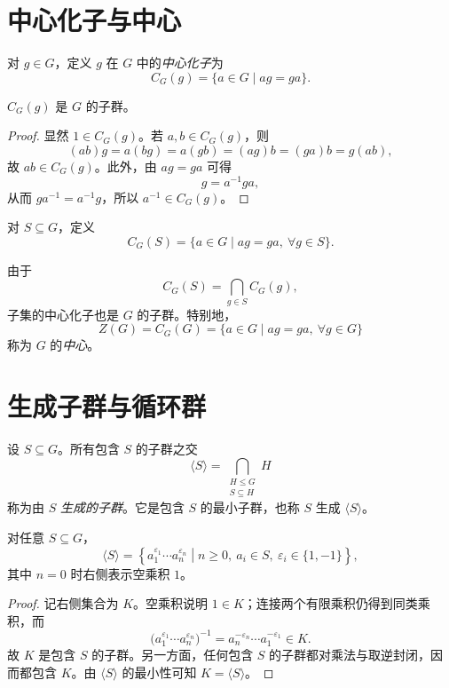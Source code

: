 \section{中心化子与中心}

\begin{definition}[元素的中心化子]
对 $g\in G$，定义 $g$ 在 $G$ 中的\emph{中心化子}为
\[
  C_G(g)=\{a\in G\mid ag=ga\}.
\]
\end{definition}

\begin{proposition}
$C_G(g)$ 是 $G$ 的子群。
\end{proposition}

\begin{proof}
显然 $1\in C_G(g)$。若 $a,b\in C_G(g)$，则
\[
  (ab)g=a(bg)=a(gb)=(ag)b=(ga)b=g(ab),
\]
故 $ab\in C_G(g)$。此外，由 $ag=ga$ 可得
\[
  g=a^{-1}ga,
\]
从而 $ga^{-1}=a^{-1}g$，所以 $a^{-1}\in C_G(g)$。
\end{proof}

\begin{definition}[子集的中心化子]
对 $S\subseteq G$，定义
\[
  C_G(S)=\{a\in G\mid ag=ga,\ \forall g\in S\}.
\]
\end{definition}

由于
\[
  C_G(S)=\bigcap_{g\in S}C_G(g),
\]
子集的中心化子也是 $G$ 的子群。特别地，
\[
  Z(G)=C_G(G)=\{a\in G\mid ag=ga,\ \forall g\in G\}
\]
称为 $G$ 的\emph{中心}。

\section{生成子群与循环群}

\begin{definition}[生成子群]
设 $S\subseteq G$。所有包含 $S$ 的子群之交
\[
  \langle S\rangle
  =\bigcap_{\substack{H\leq G\\S\subseteq H}}H
\]
称为由 $S$ \emph{生成的子群}。它是包含 $S$ 的最小子群，也称 $S$ 生成 $\langle S\rangle$。
\end{definition}

\begin{theorem}
对任意 $S\subseteq G$，
\[
  \langle S\rangle
  =\left\{
    a_1^{\varepsilon_1}\cdots a_n^{\varepsilon_n}
    \middle|
    n\geq 0,\ a_i\in S,\ \varepsilon_i\in\{1,-1\}
  \right\},
\]
其中 $n=0$ 时右侧表示空乘积 $1$。
\end{theorem}

\begin{proof}
记右侧集合为 $K$。空乘积说明 $1\in K$；连接两个有限乘积仍得到同类乘积，而
\[
  \bigl(a_1^{\varepsilon_1}\cdots a_n^{\varepsilon_n}\bigr)^{-1}
  =a_n^{-\varepsilon_n}\cdots a_1^{-\varepsilon_1}\in K.
\]
故 $K$ 是包含 $S$ 的子群。另一方面，任何包含 $S$ 的子群都对乘法与取逆封闭，因而都包含 $K$。由 $\langle S\rangle$ 的最小性可知 $K=\langle S\rangle$。
\end{proof}

